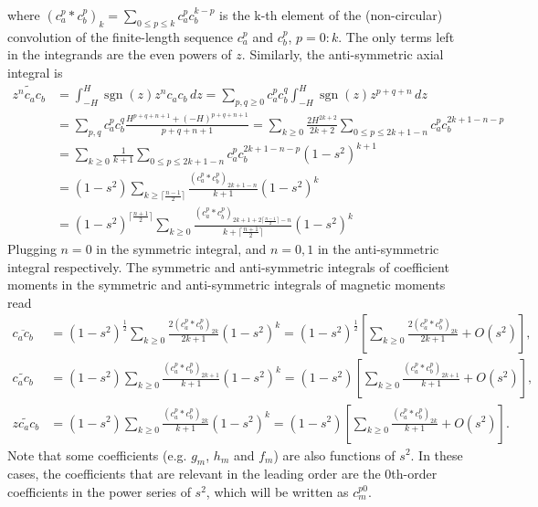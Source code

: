 \documentclass[a4paper, 11pt]{article}
\DeclareMathOperator{\sgn}{sgn}
\begin{document}
where $(c_a^p * c_b^p)_{k} = \sum_{0\leq p \leq k} c_a^p c_b^{k-p}$ is the k-th element of the (non-circular) convolution of the finite-length sequence $c_a^p$ and $c_b^p$, $p=0:k$. The only terms left in the integrands are the even powers of $z$. Similarly, the anti-symmetric axial integral is
\begin{equation}
    \begin{aligned}
        \widetilde{z^n c_a c_b} &= \int_{-H}^H \sgn(z) z^n c_a c_b \, dz = \sum_{p, q \geq 0} c_a^p c_b^q \int_{-H}^H \sgn(z) z^{p + q + n} \, dz \\
        &= \sum_{p,q} c_a^p c_b^q \frac{H^{p+q+n+1} + (-H)^{p+q+n+1}}{p + q + n + 1} 
        = \sum_{k\geq 0} \frac{2H^{2k+2}}{2k+2} \sum_{0\leq p \leq 2k+1-n} c_a^p c_b^{2k+1-n-p} \\ 
        &= \sum_{k\geq 0} \frac{1}{k+1} \sum_{0\leq p \leq 2k+1-n} c_a^p c_b^{2k+1-n-p} \left(1-s^2\right)^{k+1} \\
        &= \left(1 - s^2\right) \sum_{k\geq \lceil \frac{n-1}{2}\rceil} \frac{\left(c_a^{p} * c_b^p\right)_{2k+1-n}}{k+1} \left(1 - s^2\right)^k \\ 
        &= \left(1 - s^2\right)^{\lceil \frac{n+1}{2}\rceil} \sum_{k\geq 0} \frac{\left(c_a^{p} * c_b^p\right)_{2k+1+2\lceil \frac{n-1}{2} \rceil -n}}{k+\lceil \frac{n+1}{2}\rceil} \left(1 - s^2\right)^k
    \end{aligned}
\end{equation}
Plugging $n=0$ in the symmetric integral, and $n=0,1$ in the anti-symmetric integral respectively. The symmetric and anti-symmetric integrals of coefficient moments in the symmetric and anti-symmetric integrals of magnetic moments read
\begin{equation}
    \begin{aligned}
        \overline{c_a c_b} &= \left(1 - s^2\right)^{\frac{1}{2}} \sum_{k \geq 0} \frac{2(c_a^p * c_b^p)_{2k}}{2k+1} \left(1 - s^2\right)^k = \left(1 - s^2\right)^{\frac{1}{2}} \left[\sum_{k\geq 0} \frac{2(c_a^p * c_b^p)_{2k}}{2k+1} + O\left(s^2\right)\right], \\ 
        \widetilde{c_a c_b} &= \left(1 - s^2\right) \sum_{k \geq 0} \frac{(c_a^p * c_b^p)_{2k+1}}{k+1} \left(1 - s^2\right)^k = \left(1 - s^2\right) \left[\sum_{k\geq 0} \frac{(c_a^p*c_b^p)_{2k+1}}{k+1} + O\left(s^2\right) \right], \\ 
        \widetilde{z c_a c_b} &= \left(1 - s^2\right) \sum_{k \geq 0} \frac{(c_a^p * c_b^p)_{2k}}{k+1} \left(1 - s^2\right)^k = \left(1 - s^2\right) \left[\sum_{k \geq 0} \frac{(c_a^p * c_b^p)_{2k}}{k+1} + O\left(s^2\right)\right].
    \end{aligned}
\end{equation}
Note that some coefficients (e.g. $g_m$, $h_m$ and $f_m$) are also functions of $s^2$. In these cases, the coefficients that are relevant in the leading order are the 0th-order coefficients in the power series of $s^2$, which will be written as $c_m^{p0}$. 
\end{document}
